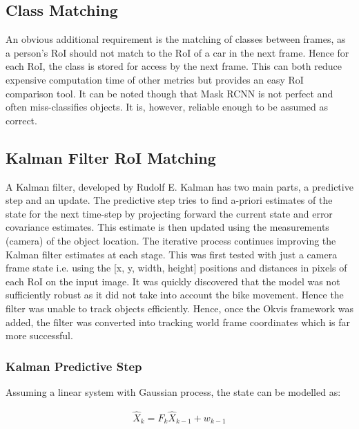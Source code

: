 \documentclass[11pt,twoside]{report}
\begin{document}
\subsection{Class Matching} \label{class_matching}
An obvious additional requirement is the matching of classes between frames, as a person's RoI should not match to the RoI of a car in the next frame. Hence for each RoI, the class is stored for access by the next frame. This can both reduce expensive computation time of other metrics but provides an easy RoI comparison tool. It can be noted though that Mask RCNN is not perfect and often miss-classifies objects. It is, however, reliable enough to be assumed as correct.

\subsection{Kalman Filter RoI Matching} \label{kalman_matching}

A Kalman filter, developed by Rudolf E. Kalman has two main parts, a predictive step and an update. The predictive step tries to find a-priori estimates of the state for the next time-step by projecting forward the current state and error covariance estimates. This estimate is then updated using the measurements (camera) of the object location. The iterative process continues improving the Kalman filter estimates at each stage. 
\newline \newline
This was first tested with just a camera frame state i.e. using the [x, y, width, height] positions and distances in pixels of each RoI on the input image. It was quickly discovered that the model was not sufficiently robust as it did not take into account the bike movement. Hence the filter was unable to track objects efficiently. Hence, once the Okvis framework was added, the filter was converted into tracking world frame coordinates which is far more successful.

\subsubsection{Kalman Predictive Step}
Assuming a linear system with Gaussian process, the state can be modelled as:

\begin{equation}
\begin{aligned}
\hat{X}_{k} =  F_{k} \hat{X}_{k-1} + w_{k-1}
\end{aligned}
\end{equation}
\end{document}

